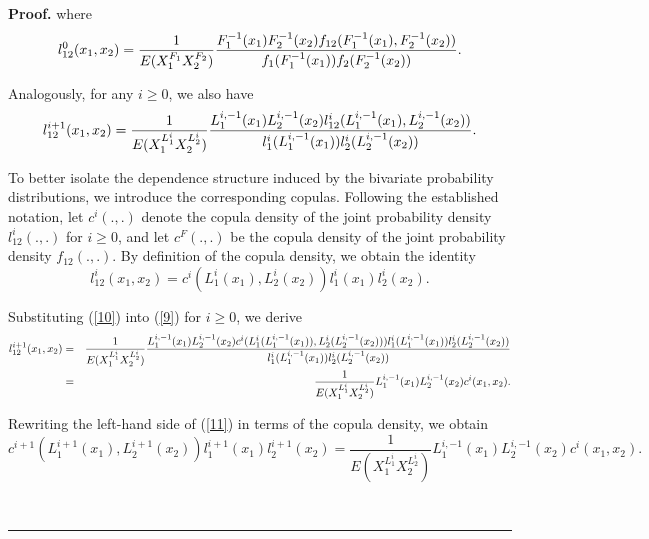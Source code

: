 \documentclass[onecolumn]{article}
\newenvironment{proof}[1][Proof]{\noindent\textbf{#1.} }{\ \rule{0.5em}{0.5em}}
\begin{document}
\begin{proof}
where 
\begin{equation}
l_{12}^{0}(x_{1},x_{2})=\frac{1}{E(X_{1}^{F_{1}}X_{2}^{F_{2}})}\frac{%
F_{1}^{-1}(x_{1})F_{2}^{-1}(x_{2})f_{12}(F_{1}^{-1}(x_{1}),F_{2}^{-1}(x_{2}))%
}{f_{1}(F_{1}^{-1}(x_{1}))f_{2}(F_{2}^{-1}(x_{2}))}.  \label{8}
\end{equation}

Analogously, for any $i\geq 0$, we also have%
\begin{equation}
l_{12}^{i+1}(x_{1},x_{2})=\frac{1}{E(X_{1}^{L_{1}^{i}}X_{2}^{L_{2}^{i}})}%
\frac{%
L_{1}^{i,-1}(x_{1})L_{2}^{i,-1}(x_{2})l_{12}^{i}(L_{1}^{i,-1}(x_{1}),L_{2}^{i,-1}(x_{2}))%
}{l_{1}^{i}(L_{1}^{i,-1}(x_{1}))l_{2}^{i}(L_{2}^{i,-1}(x_{2}))}.  \label{9}
\end{equation}

To better isolate the dependence structure induced by the bivariate
probability distributions, we introduce the corresponding copulas. Following
the established notation, let $c^{i}(.,.)$ denote the copula density of the
joint probability density $l_{12}^{i}(.,.)$ for $i\geq 0$, and let $%
c^{F}(.,.)$ be the copula density of the joint probability density $%
f_{12}(.,.)$. By definition of the copula density, we obtain the identity%
\begin{equation}
l_{12}^{i}(x_{1},x_{2})=c^{i}(L_{1}^{i}(x_{1}),L_{2}^{i}(x_{2}))l_{1}^{i}(x_{1})l_{2}^{i}(x_{2}).
\label{10}
\end{equation}

Substituting (\ref{10}) into (\ref{9}) for $i\geq 0$, we derive%
\begin{eqnarray}
l_{12}^{i+1}(x_{1},x_{2}) &=&\frac{1}{E(X_{1}^{L_{1}^{i}}X_{2}^{L_{2}^{i}})}%
\frac{%
L_{1}^{i,-1}(x_{1})L_{2}^{i,-1}(x_{2})c^{i}(L_{1}^{i}(L_{1}^{i,-1}(x_{1})),L_{2}^{i}(L_{2}^{i,-1}(x_{2})))l_{1}^{i}(L_{1}^{i,-1}(x_{1}))l_{2}^{i}(L_{2}^{i,-1}(x_{2}))%
}{l_{1}^{i}(L_{1}^{i,-1}(x_{1}))l_{2}^{i}(L_{2}^{i,-1}(x_{2}))}  \notag \\
&=&\frac{1}{E(X_{1}^{L_{1}^{i}}X_{2}^{L_{2}^{i}})}%
L_{1}^{i,-1}(x_{1})L_{2}^{i,-1}(x_{2})c^{i}(x_{1},x_{2}).  \label{11}
\end{eqnarray}

Rewriting the left-hand side of (\ref{11}) in terms of the copula density,
we obtain%
\begin{equation}
c^{i+1}(L_{1}^{i+1}(x_{1}),L_{2}^{i+1}(x_{2}))l_{1}^{i+1}(x_{1})l_{2}^{i+1}(x_{2})=%
\frac{1}{E(X_{1}^{L_{1}^{i}}X_{2}^{L_{2}^{i}})}%
L_{1}^{i,-1}(x_{1})L_{2}^{i,-1}(x_{2})c^{i}(x_{1},x_{2}).  \label{12}
\end{equation}


\end{proof}
\end{document}
